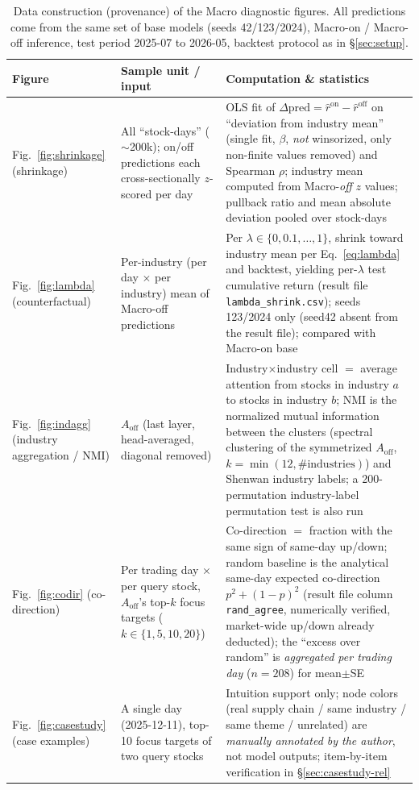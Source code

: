 \documentclass[a4paper,11pt]{article}
\begin{document}
\begin{table}[H]
\centering
\caption{Data construction (provenance) of the Macro diagnostic figures. All
predictions come from the same set of base models (seeds 42/123/2024),
Macro-on / Macro-off inference, test period 2025-07 to 2026-05, backtest
protocol as in \S\ref{sec:setup}.}
\label{tab:macro-prov}
\begin{tabularx}{\linewidth}{l>{\raggedright\arraybackslash}X>{\raggedright\arraybackslash}X}
\toprule
Figure & Sample unit / input & Computation \& statistics \\
\midrule
Fig.~\ref{fig:shrinkage} (shrinkage) & All ``stock-days'' ($\sim$200k); on/off predictions each cross-sectionally $z$-scored per day &
OLS fit of $\Delta\text{pred}{=}\hat r^{\mathrm{on}}{-}\hat r^{\mathrm{off}}$ on ``deviation from industry mean'' (single fit, $\beta$, \emph{not} winsorized, only non-finite values removed) and Spearman $\rho$; industry mean computed from Macro-\emph{off} $z$ values; pullback ratio and mean absolute deviation pooled over stock-days \\
Fig.~\ref{fig:lambda} (counterfactual) & Per-industry (per day $\times$ per industry) mean of Macro-off predictions &
Per $\lambda\in\{0,0.1,\dots,1\}$, shrink toward industry mean per Eq.~\eqref{eq:lambda} and backtest, yielding per-$\lambda$ test cumulative return (result file \texttt{lambda\_shrink.csv}); seeds 123/2024 only (seed42 absent from the result file); compared with Macro-on base \\
Fig.~\ref{fig:indagg} (industry aggregation / NMI) & $A_{\mathrm{off}}$ (last layer, head-averaged, diagonal removed) &
Industry$\times$industry cell $=$ average attention from stocks in industry $a$ to stocks in industry $b$; NMI is the normalized mutual information between the clusters (spectral clustering of the symmetrized $A_{\mathrm{off}}$, $k{=}\min(12,\#\text{industries})$) and Shenwan industry labels; a 200-permutation industry-label permutation test is also run \\
Fig.~\ref{fig:codir} (co-direction) & Per trading day $\times$ per query stock, $A_{\mathrm{off}}$'s top-$k$ focus targets ($k{\in}\{1,5,10,20\}$) &
Co-direction $=$ fraction with the same sign of same-day up/down; random baseline is the analytical same-day expected co-direction $p^2{+}(1{-}p)^2$ (result file column \texttt{rand\_agree}, numerically verified, market-wide up/down already deducted); the ``excess over random'' is \emph{aggregated per trading day} ($n{=}208$) for mean$\pm$SE \\
Fig.~\ref{fig:casestudy} (case examples) & A single day (2025-12-11), top-10 focus targets of two query stocks &
Intuition support only; node colors (real supply chain / same industry / same theme / unrelated) are \emph{manually annotated by the author}, not model outputs; item-by-item verification in \S\ref{sec:casestudy-rel} \\
\bottomrule
\end{tabularx}
\end{table}
\end{document}
